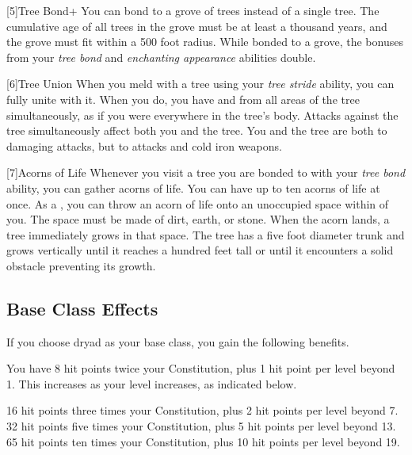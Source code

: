    [5]{Tree Bond+} You can bond to a grove of trees instead of a single tree.
      The cumulative age of all trees in the grove must be at least a thousand years, and the grove must fit within a 500 foot radius.
      While bonded to a grove, the bonuses from your \textit{tree bond} and \textit{enchanting appearance} abilities double.

    [6]{Tree Union} When you meld with a tree using your \textit{tree stride} ability, you can fully unite with it.
      When you do, you have  and  from all areas of the tree simultaneously, as if you were everywhere in the tree's body.
      Attacks against the tree simultaneously affect both you and the tree.
      You and the tree are both \impervious to damaging attacks, but \vulnerable to \atFire attacks and cold iron weapons.

    [7]{Acorns of Life} Whenever you visit a tree you are bonded to with your \textit{tree bond} ability, you can gather acorns of life.
      You can have up to ten acorns of life at once.
      As a , you can throw an acorn of life onto an unoccupied  space within \medrange of you.
      The space must be made of dirt, earth, or stone.
      When the acorn lands, a tree immediately grows in that space.
      The tree has a five foot diameter trunk and grows vertically until it reaches a hundred feet tall or until it encounters a solid obstacle preventing its growth.

  \subsection{Base Class Effects}
    \mediumhpprogressiontable

    If you choose dryad as your base class, you gain the following benefits.

      You have 8 hit points \add twice your Constitution, plus 1 hit point per level beyond 1.
      This increases as your level increases, as indicated below.
      \begin{raggeditemize}
         16 hit points \add three times your Constitution, plus 2 hit points per level beyond 7.
         32 hit points \add five times your Constitution, plus 5 hit points per level beyond 13.
         65 hit points \add ten times your Constitution, plus 10 hit points per level beyond 19.
      \end{raggeditemize}


